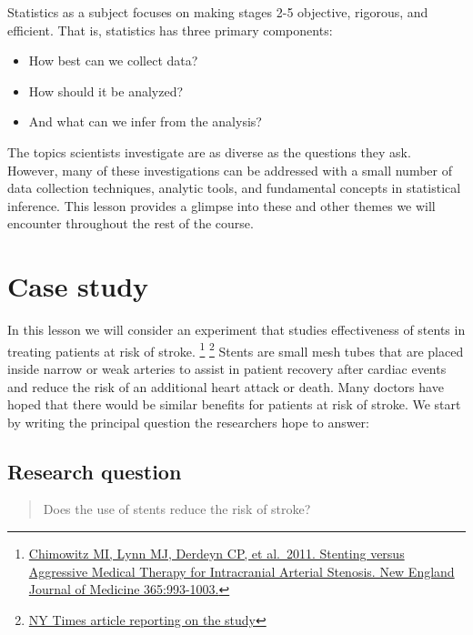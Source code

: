 \documentclass[
]{book}
\providecommand{\tightlist}{%
  \setlength{\itemsep}{0pt}\setlength{\parskip}{0pt}}
\begin{document}
Statistics as a subject focuses on making stages 2-5 objective, rigorous, and efficient. That is, statistics has three primary components:

\begin{itemize}
\tightlist
\item
  How best can we collect data?\\
\item
  How should it be analyzed?\\
\item
  And what can we infer from the analysis?
\end{itemize}

The topics scientists investigate are as diverse as the questions they ask. However, many of these investigations can be addressed with a small number of data collection techniques, analytic tools, and fundamental concepts in statistical inference. This lesson provides a glimpse into these and other themes we will encounter throughout the rest of the course.

\hypertarget{case-study}{%
\section{Case study}\label{case-study}}

In this lesson we will consider an experiment that studies effectiveness of stents in treating patients at risk of stroke. \footnote{\href{http://www.nejm.org/doi/full/10.1056/NEJMoa1105335}{Chimowitz MI, Lynn MJ, Derdeyn CP, et al.~2011. Stenting versus Aggressive Medical Therapy for Intracranial Arterial Stenosis. New England Journal of Medicine 365:993-1003.}} \footnote{\href{http://www.nytimes.com/2011/09/08/health/research/08stent.html}{NY Times article reporting on the study}} Stents are small mesh tubes that are placed inside narrow or weak arteries to assist in patient recovery after cardiac events and reduce the risk of an additional heart attack or death. Many doctors have hoped that there would be similar benefits for patients at risk of stroke. We start by writing the principal question the researchers hope to answer:

\hypertarget{research-question}{%
\subsection{Research question}\label{research-question}}

\begin{quote}
Does the use of stents reduce the risk of stroke?
\end{quote}
\end{document}
